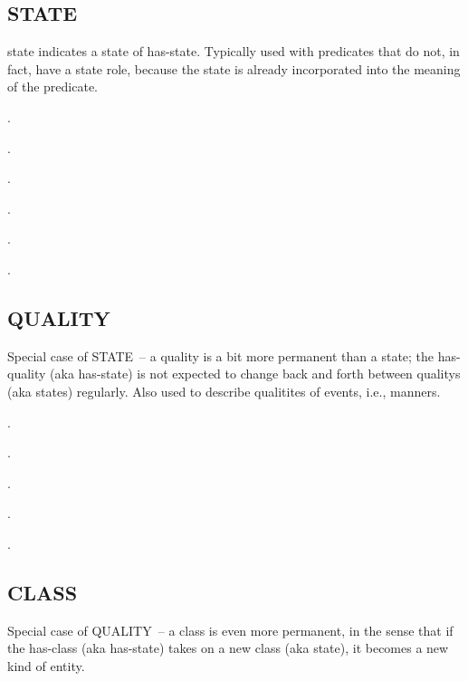 \documentclass[a4paper]{article}
\newcommand{\fr}[1]{\textsf{#1}}
\newcommand{\rl}[1]{\textsf{#1}}
\begin{document}
\newpage\subsection{ \fr{STATE}}
\label{sec:STATE}

\rl{state} indicates a state of \rl{has-state}. Typically used with predicates
that do not, in fact, have a \rl{state} role, because the state is already
incorporated into the meaning of the predicate.

\ex.

\ex.

\ex.

\ex.

\ex.

\ex.


\newpage\subsection{ \fr{QUALITY}}
\label{sec:QUALITY}

Special case of \fr{STATE} -- a quality is a bit more permanent than a state;
the \rl{has-quality} (aka \rl{has-state}) is not expected to change back and
forth between \rl{quality}s (aka \rl{state}s) regularly.  Also used to describe
qualitites of events, i.e., manners.

\ex.

\ex.

\ex.

\ex.

\ex.


\newpage\subsection{ \fr{CLASS}}
\label{sec:CLASS}

Special case of \fr{QUALITY} -- a class is even more permanent, in the sense
that if the \rl{has-class} (aka \rl{has-state}) takes on a new \rl{class} (aka
\rl{state}), it becomes a new kind of entity.
\end{document}
